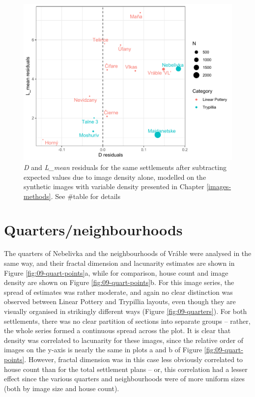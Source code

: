\documentclass[
  12pt,
]{book}
\begin{document}
\begin{figure}

{\centering \includegraphics[width=0.9\linewidth]{bookdown-demo_files/figure-latex/09-settle-resid-1} 

}

\caption{\emph{D} and \emph{L\_mean} residuals for the same settlements after subtracting expected values due to image density alone, modelled on the synthetic images with variable density presented in Chapter \ref{images-methods}. See \#table for details}\label{fig:09-settle-resid}
\end{figure}

\hypertarget{quartersneighbourhoods-1}{%
\section{Quarters/neighbourhoods}\label{quartersneighbourhoods-1}}

The quarters of Nebelivka and the neighbourhoods of Vráble were analysed in the same way, and their fractal dimension and lacunarity estimates are shown in Figure \ref{fig:09-quart-points}a, while for comparison, house count and image density are shown on Figure \ref{fig:09-quart-points}b. For this image series, the spread of estimates was rather moderate, and again no clear distinction was observed between Linear Pottery and Trypillia layouts, even though they are visually organised in strikingly different ways (Figure \ref{fig:09-quarters}). For both settlements, there was no clear partition of sections into separate groups -- rather, the whole series formed a continuous spread across the plot. It is clear that density was correlated to lacunarity for these images, since the relative order of images on the y-axis is nearly the same in plots a and b of Figure \ref{fig:09-quart-points}. However, fractal dimension was in this case less obviously correlated to house count than for the total settlement plans -- or, this correlation had a lesser effect since the various quarters and neighbourhoods were of more uniform sizes (both by image size and house count).
\end{document}
